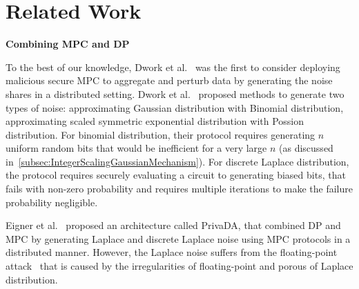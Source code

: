 \chapter{Related Work}
\label{cha:RelatedWork}

\textbf{Combining MPC and DP}


To the best of our knowledge, Dwork et al.~\cite{dwork2006our} was the first to consider deploying malicious secure MPC to aggregate and perturb data by generating the noise shares in a distributed setting. Dwork et al.~\cite{dwork2006our} proposed methods to generate two types of noise: approximating Gaussian distribution with Binomial distribution, approximating scaled symmetric exponential distribution with Possion distribution. For binomial distribution, their protocol requires generating $n$ uniform random bits that would be inefficient for a very large $n$ (as discussed in~\autoref{subsec:IntegerScalingGaussianMechanism}). For discrete Laplace distribution, the protocol requires securely evaluating a circuit to generating biased bits, that fails with non-zero probability and requires multiple iterations to make the failure probability negligible.

Eigner et al.~\cite{eigner2014differentially} proposed an architecture called PrivaDA, that combined DP and MPC by generating Laplace and discrete Laplace noise using MPC protocols in a distributed manner. However, the Laplace noise suffers from the floating-point attack~\cite{mironov2012significance} that is caused by the irregularities of floating-point and porous of Laplace distribution.

